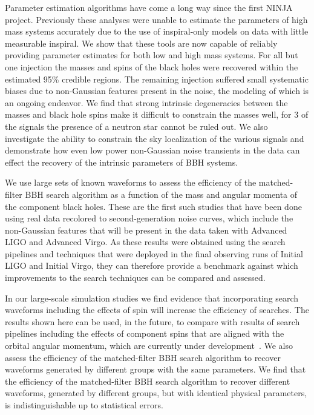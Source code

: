 \documentclass[12pt]{iopart}
\begin{document}
Parameter estimation algorithms have come a long way since the first NINJA
project. Previously these analyses were unable to estimate the parameters of
high mass systems accurately due to the use of inspiral-only models on data
with little measurable inspiral. We show that these tools are now capable of
reliably providing parameter estimates for both low and high mass systems.
For all but one injection the masses and spins of the black holes were recovered
within the estimated 95\% credible regions.  The remaining injection suffered
small systematic biases due to non-Gaussian features present in the noise, the
modeling of which is an ongoing endeavor.
We find that strong intrinsic degeneracies between the masses and black hole 
spins \cite{Baird:2012cu,Hannam:2013uu} make it difficult to constrain the 
masses well, for 3 of the signals the 
presence of a neutron star cannot be ruled out. We also investigate the ability 
to constrain the sky localization of the various signals and demonstrate how 
even low power non-Gaussian noise transients in the data can effect the 
recovery of the intrinsic parameters of BBH systems.

We use large sets of known waveforms to assess the 
efficiency of the matched-filter BBH search algorithm as a 
function of the mass and angular momenta of the component black holes. 
These are the first such studies that have been done using real data recolored 
to second-generation noise curves, which include the non-Gaussian features that 
will be present in the data taken with Advanced LIGO and Advanced Virgo. 
As these results were obtained using the search pipelines and techniques that
were deployed in the final observing runs of Initial LIGO and Initial Virgo, 
they can therefore provide a benchmark against which improvements to the search 
techniques can be compared and assessed. 

In our large-scale simulation studies we find 
evidence that incorporating search waveforms including the effects of spin will 
increase the efficiency of searches. The results shown here can be used, in the 
future, to 
compare with results of search pipelines including the effects of component 
spins that are aligned with the orbital angular momentum, which are currently 
under development~\cite{Brown:2012qf,Ajith:2012mn,Harry:2013tca}. We also 
assess 
the efficiency of the matched-filter 
BBH search algorithm to recover waveforms generated by different 
groups with the same parameters. We find that the 
efficiency of the matched-filter BBH search algorithm to recover 
different waveforms, generated by different groups, but with identical physical 
parameters, is indistinguishable up to statistical errors.
\end{document}
